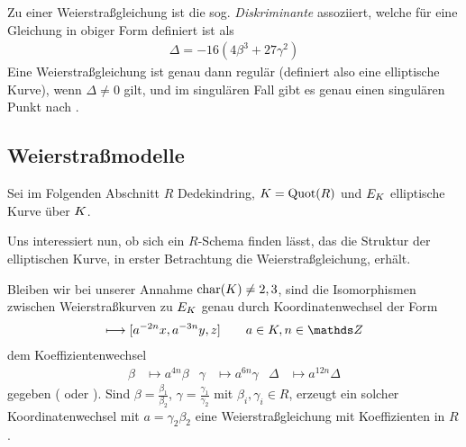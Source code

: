 \documentclass[german]{scrreprt}
\begin{document}
Zu einer Weierstraßgleichung ist die sog. \emph{Diskriminante}
assoziiert, welche für eine Gleichung in obiger Form definiert ist als
\begin{gather*}
  \Delta = -16\left(4\beta^3 + 27\gamma^2\right)
\end{gather*}
Eine Weierstraßgleichung ist genau dann regulär (definiert also eine
elliptische Kurve), wenn $\Delta\neq 0$ gilt,
und im singulären Fall gibt es genau einen singulären Punkt
nach \cite[Proposition III.1.4]{silverman}.


\subsection{Weierstraßmodelle}
Sei im Folgenden Abschnitt $R$ Dedekindring,
$K=\operatorname{Quot}(R)$ und $E_{K}$ elliptische Kurve über $K$.

Uns interessiert nun, ob sich ein $R$-Schema finden lässt, das die
Struktur der elliptischen Kurve, in erster Betrachtung die
Weierstraßgleichung, erhält.

Bleiben wir bei unserer Annahme $\operatorname{char}(K)\neq2,3$, sind die
Isomorphismen zwischen Weierstraßkurven zu $E_{K}$ genau durch
Koordinatenwechsel der Form
\begin{gather*}
  [x,y,z] \longmapsto [a^{-2n}x, a^{-3n}y, z] \qquad a\in\K, n\in\Z
\end{gather*}
dem Koeffizientenwechsel
\begin{align*}
  \beta&\mapsto a^{4n}\beta
  &\gamma&\mapsto a^{6n}\gamma
  &\Delta&\mapsto a^{12n}\Delta
\end{align*}
gegeben
(\cite[1.5, Lemma 2]{neron} oder \cite[Chapter VII.1]{silverman}).
Sind $\beta=\frac{\beta_1}{\beta_2}$,
$\gamma=\frac{\gamma_1}{\gamma_2}$ mit $\beta_i,\gamma_i\in R$,
erzeugt ein solcher Koordinatenwechsel mit $a=\gamma_2\beta_2$ eine
Weierstraßgleichung mit Koeffizienten in $R$.
\end{document}
